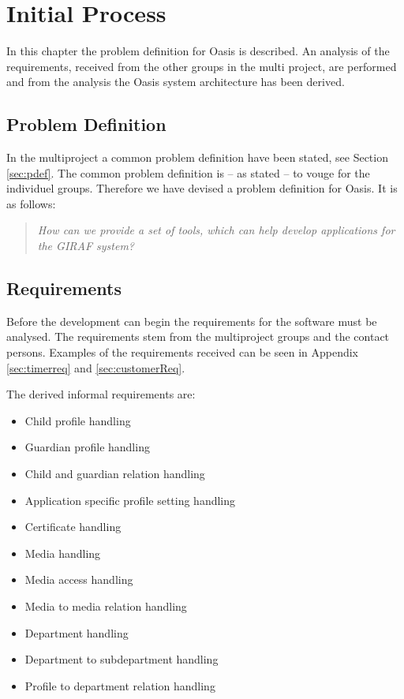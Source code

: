 \chapter{Initial Process}
In this chapter the problem definition for Oasis is described.
An analysis of the requirements, received from the other groups in the multi project, are performed and from the analysis the Oasis system architecture has been derived.

\section{Problem Definition}
\label{sec:OasisProblemDefinition}
In the multiproject a common problem definition have been stated, see Section \vref{sec:pdef}. The common problem definition is -- as stated -- to vouge for the individuel groups. Therefore we have devised a problem definition for Oasis.
It is as follows:

\begin{quotation}
	\textit{How can we provide a set of tools, which can help develop applications for the GIRAF system?}
\end{quotation}

\section{Requirements}
Before the development can begin the requirements for the software must be analysed.
The requirements stem from the multiproject groups and the contact persons.
Examples of the requirements received can be seen in Appendix \vref{sec:timerreq} and \vref{sec:customerReq}.

The derived informal requirements are:
\begin{itemize}
	\item Child profile handling
	\item Guardian profile handling
	\item Child and guardian relation handling
	\item Application specific profile setting handling
	\item Certificate handling
	\item Media handling
	\item Media access handling
	\item Media to media relation handling
	\item Department handling
	\item Department to subdepartment handling
	\item Profile to department relation handling
\end{itemize}

